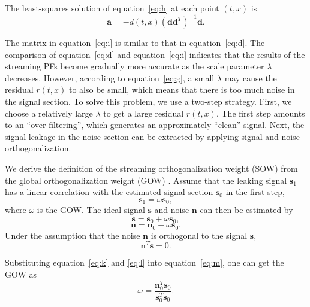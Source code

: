 The least-squares solution of equation~\ref{eq:h} at each point $(t,x)$ is
\begin{equation}
  \label{eq:i}
\mathbf{a}=-d(t,x)(\mathbf{d}\mathbf{d}^T)^{-1}\mathbf{d}.
\end{equation}

The matrix in equation~\ref{eq:i} is similar to that in
equation~\ref{eq:d}. The comparison of equation~\ref{eq:d} and
equation~\ref{eq:i} indicates that the results of the streaming PFs
become gradually more accurate as the scale parameter $\lambda$
decreases. However, according to equation~\ref{eq:g}, a small
$\lambda$ may cause the residual $r(t,x)$ to also be small, which
means that there is too much noise in the signal section. To solve
this problem, we use a two-step strategy. First, we
choose a relatively large $\lambda$ to get a large residual
$r(t,x)$. The first step amounts to an ``over-filtering'', which
generates an approximately ``clean'' signal. Next, the
signal leakage in the noise section can be extracted by applying
signal-and-noise orthogonalization.

We derive the definition of the streaming orthogonalization
weight (SOW) from the global orthogonalization weight (GOW)
\cite[]{Chen15}. Assume that the leaking signal $\mathbf{s}_1$ has a
linear correlation with the estimated signal section $\mathbf{s}_0$ in
the first step,
\begin{equation}
  \label{eq:j}
\mathbf{s}_1=\omega\mathbf{s}_0,
\end{equation}
where $\omega$ is the GOW. The ideal signal $\mathbf{s}$ and noise
$\mathbf{n}$ can then be estimated by
\begin{equation}
  \label{eq:k}
\mathbf{s}=\mathbf{s}_0+\omega\mathbf{s}_0,
\end{equation}
\begin{equation}
  \label{eq:l}
\mathbf{n}=\mathbf{n}_0-\omega\mathbf{s}_0.
\end{equation}
Under the assumption that the noise $\mathbf{n}$ is orthogonal
to the signal $\mathbf{s}$, 
\begin{equation} \label{eq:m}
\mathbf{n}^T\mathbf{s}=0.
\end{equation}

Substituting equation~\ref{eq:k} and \ref{eq:l} into
equation~\ref{eq:m}, one can get the GOW
 as \begin{equation} \label{eq:n}
\omega=\frac{\mathbf{n}_0^T\mathbf{s}_0}{\mathbf{s}_0^T\mathbf{s}_0}.
\end{equation}

